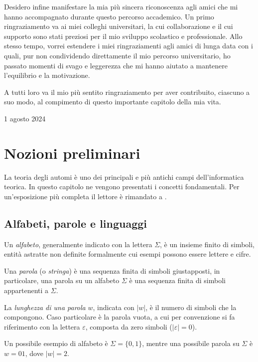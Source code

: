 \documentclass[a4paper,12pt]{report} %
\begin{document}
Desidero infine manifestare la mia più sincera riconoscenza agli amici che mi hanno accompagnato durante
questo percorso accademico. Un primo ringraziamento va ai miei colleghi universitari, la cui collaborazione
e il cui supporto sono stati preziosi per il mio sviluppo scolastico e professionale. 
Allo stesso tempo, vorrei estendere i miei ringraziamenti agli amici di lunga data con i quali,
pur non condividendo direttamente il mio percorso universitario, ho passato momenti di svago e leggerezza
che mi hanno aiutato a mantenere l'equilibrio e la motivazione.

A tutti loro va il mio più sentito ringraziamento per aver contribuito, ciascuno a suo modo, 
al compimento di questo importante capitolo della mia vita.

\hfill 1 agosto 2024


\afterpreface


\chapter{Nozioni preliminari}
\label{cap1}

La teoria degli automi è uno dei principali e più antichi campi dell'informatica teorica. In questo capitolo
ne vengono presentati i concetti fondamentali. Per un'esposizione più completa il lettore è rimandato a \parencite{HMU06}.

\section{Alfabeti, parole e linguaggi}

Un \emph{alfabeto}, generalmente indicato con la lettera $\Sigma$, è un insieme finito di simboli,
entità astratte non definite formalmente cui esempi possono essere lettere e cifre.

Una \emph{parola} (o \emph{stringa}) è una sequenza finita di simboli giustapposti, in particolare, una parola su un alfabeto $\Sigma$
è una sequenza finita di simboli appartenenti a $\Sigma$.

La \emph{lunghezza di una parola} $w$, indicata con $|w|$, è il numero di simboli che la compongono.
Caso particolare è la parola vuota, a cui per convenzione si fa riferimento con la lettera $\varepsilon$,
composta da zero simboli ($|\varepsilon| = 0$).

Un possibile esempio di alfabeto è $\Sigma = \{0, 1\}$, mentre una possibile parola su $\Sigma$ è
$w = 01$, dove $|w| = 2$.
\end{document}
